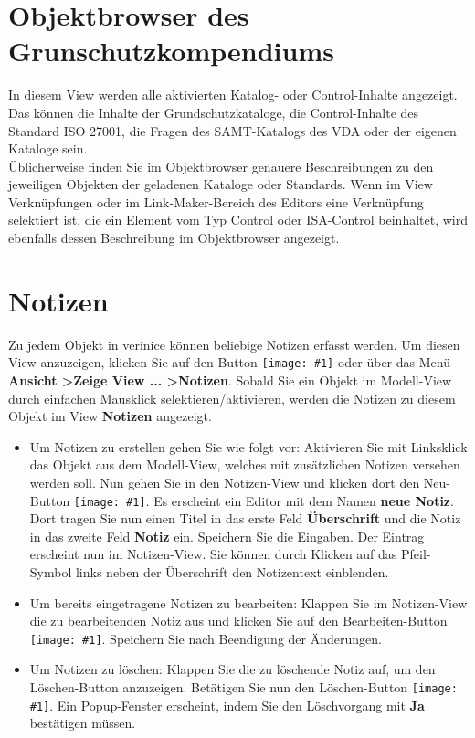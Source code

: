 \documentclass[a4paper,10pt]{book}
\newcommand{\icon}[1]{\texttt{[image: \#1]}}
\begin{document}
\section{Objektbrowser des Grunschutzkompendiums}
In diesem View werden alle aktivierten Katalog- oder Control-Inhalte angezeigt. Das können die Inhalte der Grundschutzkataloge, die Control-Inhalte des
Standard ISO 27001, die Fragen des SAMT-Katalogs des VDA oder der eigenen Kataloge sein.
\newline\\
Üblicherweise finden Sie im Objektbrowser genauere Beschreibungen zu den jeweiligen Objekten der geladenen Kataloge oder Standards. Wenn im View Verknüpfungen
oder im Link-Maker-Bereich des Editors eine Verknüpfung selektiert ist, die ein Element vom Typ Control oder ISA-Control beinhaltet, wird ebenfalls dessen
Beschreibung im Objektbrowser angezeigt.

\section{Notizen}
Zu jedem Objekt in verinice können beliebige Notizen erfasst werden. Um diesen View anzuzeigen, klicken Sie auf den Button \icon{Icon/Notizen.png}
oder über das Menü \textbf{Ansicht \textgreater Zeige View ... \textgreater Notizen}. Sobald Sie ein Objekt im Modell-View durch einfachen Mausklick selektieren/aktivieren,
werden die Notizen zu diesem Objekt im View \textbf{Notizen} angezeigt.
\begin{itemize}
 \item Um Notizen zu erstellen gehen Sie wie folgt vor: Aktivieren Sie mit Linksklick das Objekt aus dem Modell-View, welches mit
zusätzlichen Notizen versehen werden soll. Nun gehen Sie in den Notizen-View und klicken dort den Neu-Button \icon{Icon/Oeffnen.png}. Es erscheint ein
Editor mit dem Namen \textbf{neue Notiz}. Dort tragen Sie nun einen Titel in das erste Feld \textbf{Überschrift} und die Notiz in das zweite Feld \textbf{Notiz} ein.
Speichern Sie die Eingaben. Der Eintrag erscheint nun im Notizen-View. Sie können durch Klicken auf das Pfeil-Symbol links neben der Überschrift
den Notizentext einblenden.
\item Um bereits eingetragene Notizen zu bearbeiten: Klappen Sie im Notizen-View die zu bearbeitenden Notiz aus und klicken Sie auf den
Bearbeiten-Button \icon{Icon/Edit.png}. Speichern Sie nach Beendigung der Änderungen.
\item Um Notizen zu löschen: Klappen Sie die zu löschende Notiz auf, um den Löschen-Button anzuzeigen. Betätigen Sie nun den Löschen-Button \icon{Icon/Delete.png}.
Ein Popup-Fenster erscheint, indem Sie den Löschvorgang mit \textbf{Ja} bestätigen müssen.
\end{itemize}
\end{document}
